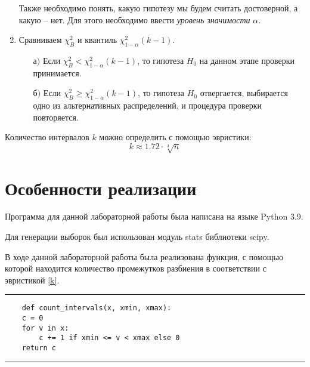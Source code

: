 \documentclass[12pt]{article}
\begin{document}
\begin{enumerate}
Также необходимо понять, какую гипотезу мы будем считать достоверной, а какую -- нет. Для этого необходимо ввести \textit{уровень значимости} $\alpha$.

		\item Сравниваем $\chi^2_B$ и квантиль  $\chi^2_{1-\alpha}(k-1)$.
		\begin{itemize}
			\item[$\text{а)}$] Если $\chi^2_B < \chi^2_{1-\alpha}(k-1)$, то гипотеза $H_0$ на данном этапе проверки принимается.
			\item[$\text{б)}$] Если $\chi^2_B \geq \chi^2_{1-\alpha}(k-1)$, то гипотеза $H_0$ отвергается, выбирается одно из альтернативных распределений, и процедура проверки повторяется.
		\end{itemize}
	\end{enumerate}
	Количество интервалов $k$ можно определить с помощью эвристики:
	\begin{equation}
		k \approx 1.72\cdot\sqrt[3]{n}
		\label{k}
	\end{equation}

\newpage
\section{Особенности реализации}
Программа для данной лабораторной работы была написана на языке Python 3.9. 
\par Для генерации выборок был использован модуль stats библиотеки scipy.  
	
\par В ходе данной лабораторной работы была реализована функция, с помощью которой находится количество промежутков разбиения в соответствии с эвристикой \eqref{k}.
	\vskip 0.3cm
\hrule width 16cm height 1pt
\begin{verbatim}	 
	def count_intervals(x, xmin, xmax):
    c = 0
    for v in x:
        c += 1 if xmin <= v < xmax else 0
    return c
\end{verbatim}	 
\hrule width 16cm height 1pt
    
\end{document}
